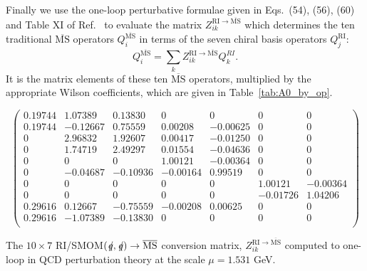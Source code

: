 \documentclass[aps,prl,
superscriptaddress,
showpacs,
preprintnumbers,
bibnotes,
amsmath,
amssymb,
twocolumn,
floatfix,
]{revtex4-1}
\def\slashed#1{\kern+0.10em /\kern-0.50em #1}
\begin{document}
Finally we use the one-loop perturbative formulae given in Eqs.~(54), (56), (60) and Table XI of Ref.~\cite{Lehner:2011fz} to evaluate the matrix $Z^{\mathrm{RI}\to\overline{\mathrm{MS}}}_{ik}$ which determines the ten traditional $\overline{\mathrm{MS}}$ operators $Q^{\overline{\mathrm{MS}}}_i$ in terms of the seven chiral basis operators $Q^{\mathrm{RI}}_j$:
\begin{equation}
Q^{\overline{\mathrm{MS}}}_i = \sum_k Z^{\mathrm{RI}\to\overline{\mathrm{MS}}}_{ik}Q^{RI}_k.
\end{equation}
It is the matrix elements of these ten $\overline{\mathrm{MS}}$ operators, multiplied by the appropriate Wilson coefficients, which are given in Table~\ref{tab:A0_by_op}.

\begin{table}
\begin{equation}
\left(
\begin{array}{ccccccc}
0.19744	& 1.07389	& 0.13830	& 0			& 0			& 0			& 0 \\
0.19744	&-0.12667	& 0.75559	& 0.00208	&-0.00625	& 0			& 0 \\
0		& 2.96832	& 1.92607	& 0.00417	&-0.01250	& 0			& 0 \\
0 		& 1.74719	& 2.49297	& 0.01554 	&-0.04636	& 0			& 0 \\
0 		& 0 			& 0 			& 1.00121	&-0.00364	& 0			& 0 \\
0 		&-0.04687 	& -0.10936	&-0.00164	& 0.99519	& 0			& 0 \\
0 		& 0 			& 0 			& 0			& 0 			& 1.00121	&-0.00364 \\
0 		& 0 			& 0 			& 0			& 0 			&-0.01726 	& 1.04206 \\
0.29616	& 0.12667	& -0.75559 	& -0.00208	& 0.00625 	& 0 			& 0 \\
0.29616	&-1.07389	& -0.13830 	& 0			& 0 			& 0			& 0 \\
\end{array}
\right)
\nonumber
\end{equation}

\caption{The $10\times 7$ RI/SMOM$(\slashed q,\slashed q)\to \overline{\rm MS}$ conversion matrix, $Z^{\mathrm{RI}\to\overline{\mathrm{MS}}}_{ik}$ computed to one-loop in QCD perturbation theory at the scale $\mu=1.531$ GeV. \label{tab:rimomtoMSbarcoeffs}}

\end{table}
\end{document}
